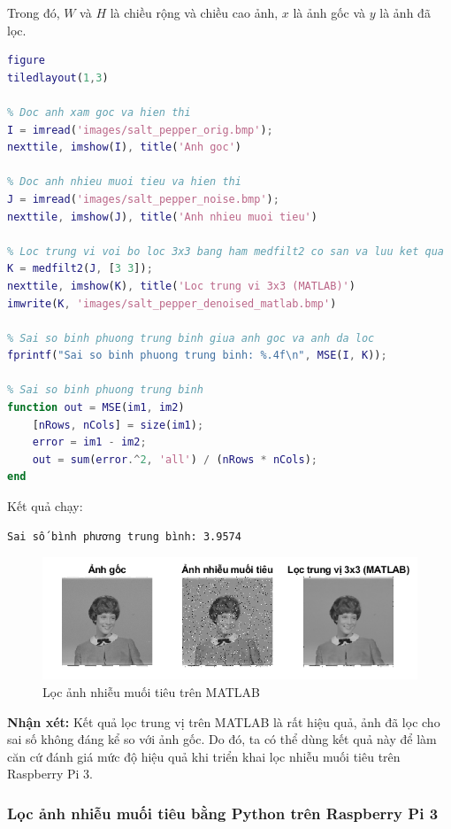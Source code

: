 Trong đó, $W$ và $H$ là chiều rộng và chiều cao ảnh, $x$ là ảnh gốc và $y$ là ảnh đã lọc.

\begin{lstlisting}[language=MATLAB]
figure
tiledlayout(1,3)

% Doc anh xam goc va hien thi
I = imread('images/salt_pepper_orig.bmp');
nexttile, imshow(I), title('Anh goc')

% Doc anh nhieu muoi tieu va hien thi
J = imread('images/salt_pepper_noise.bmp');
nexttile, imshow(J), title('Anh nhieu muoi tieu')

% Loc trung vi voi bo loc 3x3 bang ham medfilt2 co san va luu ket qua
K = medfilt2(J, [3 3]);
nexttile, imshow(K), title('Loc trung vi 3x3 (MATLAB)')
imwrite(K, 'images/salt_pepper_denoised_matlab.bmp')

% Sai so binh phuong trung binh giua anh goc va anh da loc
fprintf("Sai so binh phuong trung binh: %.4f\n", MSE(I, K));

% Sai so binh phuong trung binh
function out = MSE(im1, im2)
    [nRows, nCols] = size(im1);
    error = im1 - im2;
    out = sum(error.^2, 'all') / (nRows * nCols);
end
\end{lstlisting}

Kết quả chạy:

\begin{verbatim}
Sai số bình phương trung bình: 3.9574
\end{verbatim}

\begin{figure}[H]
    \centering
    \includegraphics[width=1\linewidth]{images/salt_pepper_denoise_matlab.png}
    \caption{Lọc ảnh nhiễu muối tiêu trên MATLAB}
    \label{fig:salt_pepper_denoise_matlab}
\end{figure}

\textbf{Nhận xét:} Kết quả lọc trung vị trên MATLAB là rất hiệu quả, ảnh đã lọc cho sai số không đáng kể so với ảnh gốc. Do đó, ta có thể dùng kết quả này để làm căn cứ đánh giá mức độ hiệu quả khi triển khai lọc nhiễu muối tiêu trên Raspberry Pi 3.

\subsubsection{Lọc ảnh nhiễu muối tiêu bằng Python trên Raspberry Pi 3}

